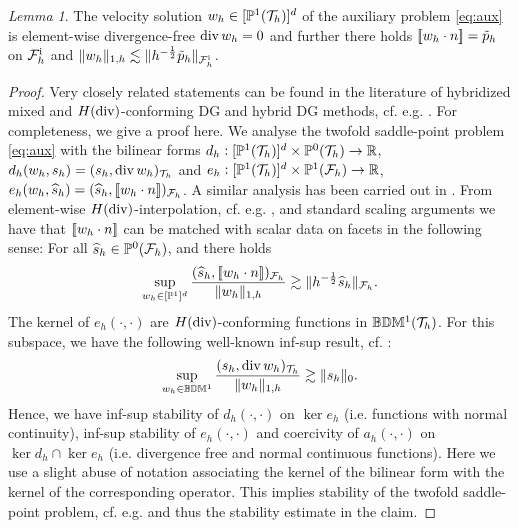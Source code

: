 \documentclass[pdflatex,sn-mathphys,Numbered]{sn-jnl}%
\renewcommand{\hat}[1]{\widehat{#1}}
\theoremstyle{remark}%
\newtheorem{lemma}[theorem]{Lemma}
\theoremstyle{definition}%
\begin{document}
\begin{lemma}\label{lem:aux} The velocity solution $w_h \in
  [\mathbb{P}^1({\mathcal{T}_h})]^d$ of the auxiliary problem \eqref{eq:aux} is
  element-wise divergence-free $\operatorname{\mathrm{div}} w_h = 0$ and further there holds
  $[\![w_h \cdot n]\!] = \tilde{p}_h$ on ${\mathcal{F}_h^{\text{i}}}$ and $\Vert w_h \Vert_{1,h}
  \lesssim \Vert h^{-\frac12}\tilde{p}_h \Vert_{{\mathcal{F}_h^{\text{i}}}}$.
\end{lemma}
\begin{proof}
  Very closely related statements can be found in the literature of hybridized mixed and $H(\operatorname{\mathrm{div}})$-conforming DG and hybrid DG methods, cf. e.g. \cite{cockburn2005locally,cockburn2007note}. For completeness, we give a proof here.
  We analyse the twofold saddle-point problem \eqref{eq:aux} with the bilinear forms $d_h: [\mathbb{P}^1({\mathcal{T}_h})]^d \times \mathbb{P}^0({\mathcal{T}_h}) \to \mathbb{R}$, $d_h(w_h,s_h) = (s_h,\operatorname{\mathrm{div}} w_h)_{\mathcal{T}_h}$ and 
  $e_h: [\mathbb{P}^1({\mathcal{T}_h})]^d \times \mathbb{P}^1({\mathcal{F}_h}) \to \mathbb{R}$, 
  $e_h(w_h, \hat{s}_h) = (\hat{s}_h, \jmp{w_h \cdot n})_\Fh$. A similar analysis has been carried out in \cite[Lemma 4.3.6]{alemanmaster}. From element-wise $H(\operatorname{\mathrm{div}})$-interpolation, cf. e.g. \cite[Proposition 2.5.1]{brezzi}, and standard scaling arguments we have that $[\![w_h\cdot n]\!]$ can be matched with scalar data on facets in the following sense: For all $\hat{s}_h \in \PP^0(\Fh)$, and there holds
  \begin{equation}
    \sup_{w_h \in [\PP^1]^d} \frac{(\hat{s}_h, \jmp{w_h \cdot n})_\Fh}{\nrm{w_h}_{1,h}} \gtrsim \nrm{h^{-\frac12}\hat{s}_h}_{\Fh}.
  \end{equation}
  The kernel of $e_h(\cdot,\cdot)$ are $H(\operatorname{\mathrm{div}})$-conforming functions in $\mathbb{B}\mathbb{D}\mathbb{M}^1({\mathcal{T}_h})$. For this subspace, we have the following well-known inf-sup result, cf. \cite{hansbolarson02,cockburn2007note}:
  \begin{equation}
    \sup_{w_h \in \mathbb{B}\mathbb{D}\mathbb{M}^1} \frac{(s_h, \operatorname{\mathrm{div}} w_h)_{\mathcal{T}_h}}{\Vert w_h \Vert_{1,h}} \gtrsim \Vert s_h \Vert_{0}.
  \end{equation}
  Hence, we have inf-sup stability of $d_h(\cdot,\cdot)$ on $\ker e_h$ (i.e. functions with normal continuity), inf-sup stability of $e_h(\cdot,\cdot)$ and coercivity of $a_h(\cdot,\cdot)$ on $\ker d_h \cap \ker e_h$ (i.e. divergence free and normal continuous functions). Here we use a slight abuse of notation associating the kernel of the bilinear form with the kernel of the corresponding operator. This implies stability of the twofold saddle-point problem, cf. e.g. \cite{saddle} and thus the stability estimate in the claim.
\end{proof}
\end{document}
